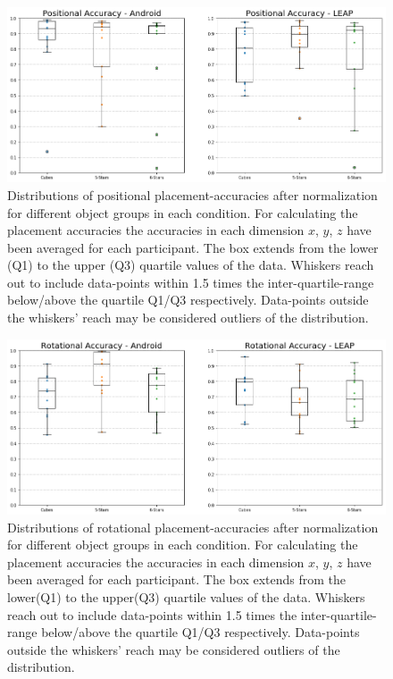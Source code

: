 \begin{figure}[htbp]
    \centering    \includegraphics[width=1\textwidth]{figures/accuracy_pos_boxplot.png}
    \caption{
    \textsf{Distributions of positional placement-accuracies after normalization for different object groups in each condition.
    For calculating the placement accuracies the accuracies in each dimension $x$, $y$, $z$ have been averaged for each participant.
    The box extends from the lower (Q1) to the upper (Q3) quartile values of the data.
    Whiskers reach out to include data-points within 1.5 times the inter-quartile-range below/above the quartile Q1/Q3 respectively.
    Data-points outside the whiskers' reach may be considered outliers of the distribution.}
    }
    \label{fig:accuracy_pos_boxplot}
\end{figure}
\begin{figure}[htbp]
    \centering    \includegraphics[width=1\textwidth]{figures/accuracy_rot_boxplot.png}
    \caption{
    \textsf{Distributions of rotational placement-accuracies after normalization for different object groups in each condition. For calculating the placement accuracies the accuracies in each dimension $x$, $y$, $z$ have been averaged for each participant.
    The box extends from the lower(Q1) to the upper(Q3) quartile values of the data.
    Whiskers reach out to include data-points within 1.5 times the inter-quartile-range below/above the quartile Q1/Q3 respectively.
    Data-points outside the whiskers' reach may be considered outliers of the distribution.}
    }
    \label{fig:accuracy_rot_boxplot}
\end{figure}



